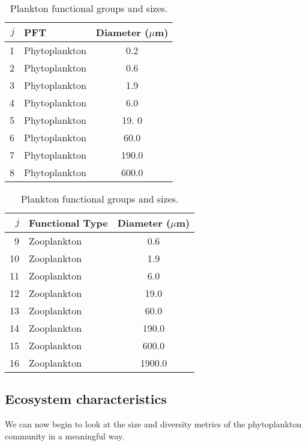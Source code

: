 \documentclass[11pt,fleqn]{book} %
\begin{document}
\begin{table}[htp!]
\begin{center}
\caption{Plankton functional groups and sizes.}
\begin{tabular}{rlc}
\hline
$j$     & PFT                   & \multicolumn{1}{r}{Diameter ($\mu$m)}  \\
\hline
1       & Phytoplankton         & 0.2  \\
2       & Phytoplankton         & 0.6  \\
3       & Phytoplankton         & 1.9  \\
4       & Phytoplankton         & 6.0  \\
5       & Phytoplankton         & 19. 0 \\
6       & Phytoplankton         & 60.0  \\
7       & Phytoplankton         & 190.0  \\
8       & Phytoplankton         & 600.0  \\
\hline 
\end{tabular} 
\begin{tabular}{rlc}
\hline
$j$     & Functional Type       & \multicolumn{1}{r}{Diameter ($\mu$m)}  \\
\hline
9       & Zooplankton           & 0.6  \\
10      & Zooplankton           & 1.9  \\
11      & Zooplankton           & 6.0  \\
12      & Zooplankton           & 19.0 \\
13      & Zooplankton           & 60.0  \\
14      & Zooplankton           & 190.0  \\
15      & Zooplankton           & 600.0  \\
16      & Zooplankton           & 1900.0  \\
\hline 
\end{tabular} 
\label{planktonconfig2}
\end{center}
\end{table}
\vspace{-4mm}


\subsection{Ecosystem characteristics} We can now begin to look at the size and diversity metrics of the phytoplankton community in a meaningful way.
\end{document}
